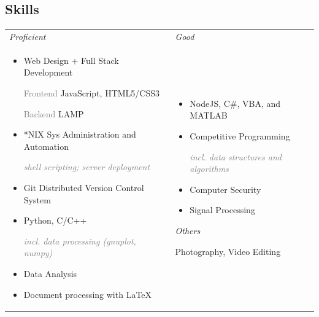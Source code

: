 \documentclass[11pt]{article}
\begin{document}
	\subsection*{Skills}
	\vspace{-\parskip}
		{
			\renewcommand{\arraystretch}{1.5}
			\setlength{\tabcolsep}{12pt}
			\begin{tabularx}{\textwidth}{@{} p{} p{} @{}}
				\textcolor{skiheader}{\textit{Proficient}} & \textcolor{skiheader}{\textit{Good}} \\
				\vspace{-1em}
				\begin{itemize}[leftmargin=3mm]
					\renewcommand\labelitemi{}
					\setlength\itemsep{0.7em}
					\item Web Design + Full Stack Development \par
						\vspace{1mm}
						\hspace{1em} \textcolor{gray}{Frontend} \hfill JavaScript, HTML\textcolor{Bittersweet}{5}/CSS\textcolor{Bittersweet}{3} \par
						\hspace{1em} \textcolor{gray}{Backend} \hfill LAMP 
					\item \**NIX Sys Administration and Automation \par
						\hfill \textcolor{gray}{\footnotesize \itshape shell scripting; server deployment}
					\item Git Distributed Version Control System
					\item Python, C/C++ \par
						\hfill \textcolor{gray}{\footnotesize \itshape incl. data processing (gnuplot, numpy)}
					\item Data Analysis
					\item Document processing with{\fontfamily{cmr} \selectfont \LaTeX}
				\end{itemize} & 
				\vspace{-1em}
				\begin{itemize}[leftmargin=3mm]
					\renewcommand\labelitemi{}
					\setlength\itemsep{0.7em}
					\item NodeJS, C\#, VBA, and MATLAB 
					\item Competitive Programming \par
						\hfill \textcolor{gray}{\footnotesize \itshape incl. data structures and algorithms}
					\item Computer Security
					\item Signal Processing
				\end{itemize}
				\vspace{1cm}
				\textcolor{skiheader}{\textit{Others}} \par
				\hspace{2mm} Photography, Video Editing 


\end{tabularx}}
\end{document}
